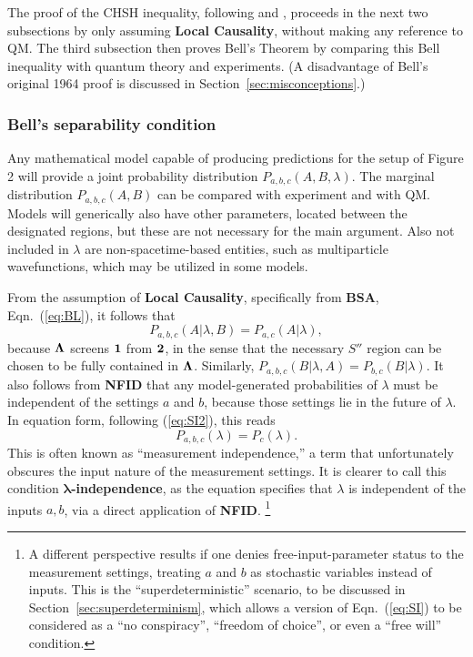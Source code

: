 \documentclass[rmp, aps, preprint, longbibliography]{revtex4-1}
\newcommand{\eq}[1]{{Eqn.~(\ref{#1})}}
\begin{document}
The proof of the CHSH inequality, following \textcite{bell1976b,bell1981,bell1990} and \textcite{peres1978}, proceeds in the next two subsections by only assuming {\bf Local Causality}, without making any reference to QM\@.  The third subsection then proves Bell's Theorem by comparing this Bell inequality with quantum theory and experiments. (A disadvantage of Bell's original 1964 proof is discussed in Section~\ref{sec:misconceptions}.) 

\subsubsection{Bell's separability condition}

Any mathematical model capable of producing predictions for the setup of Figure 2 will provide a joint probability distribution $P_{a,b,c}(A,B,\lambda)$.  The marginal distribution $P_{a,b,c}(A,B)$ can be compared with experiment and with QM\@.  Models will generically also have other parameters, located between the designated regions, but these are not necessary for the main argument.  Also
not included in $\lambda$ are non-spacetime-based entities, such as multiparticle wavefunctions, which may be utilized in some models. 

From the assumption of {\bf Local Causality}, specifically from {\bf BSA}, \eq{eq:BL}, it follows that 
\begin{equation}
\label{eq:BL1}
P_{a,b,c}(A|\lambda,B) = P_{a,c}(A| \lambda),
\end{equation} 
because $\bf{\Lambda}$ screens $\bf{1}$ from $\bf{2}$, in the sense that the necessary $S''$ region can be chosen to be fully contained in $\bf{\Lambda}$.  Similarly, $P_{a,b,c}(B|\lambda,A) = P_{b,c}(B|\lambda)$.  It also follows from {\bf NFID} that any model-generated probabilities of $\lambda$ must be independent of the settings $a$ and $b$, because those settings lie in the future of $\lambda$. In equation form, following (\ref{eq:SI2}), this reads
\begin{equation}
\label{eq:SI}
P_{a,b,c}(\lambda)=P_c(\lambda).
\end{equation}
This is often known as ``measurement independence,'' a term that unfortunately obscures the input nature of the measurement settings.  It is clearer to call this condition {\bf $\bm{\lambda}$-independence}, as the equation specifies that $\lambda$ is independent of the inputs $a,b$, via a direct application of {\bf NFID}.%
\footnote{
\label{fn:superdet}%
A different perspective results if one denies free-input-parameter status to the measurement settings, treating $a$ and $b$ as stochastic variables instead of inputs.  This is the ``superdeterministic'' scenario, to be discussed in Section~\ref{sec:superdeterminism}, which allows a version of Eqn.~(\ref{eq:SI}) to be considered as a ``no conspiracy'', ``freedom of choice'', or even a ``free will'' condition.}
\end{document}
